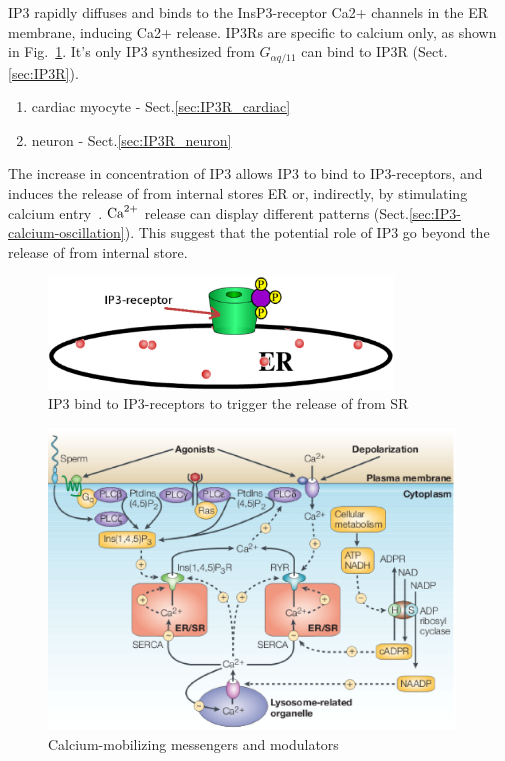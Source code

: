 IP3 rapidly diffuses and binds to the InsP3-receptor Ca2+ channels in the ER
membrane, inducing Ca2+ release. IP3Rs are specific to calcium only, as shown in
Fig.~\ref{fig:IP3-IP3R}.  It's only IP3 synthesized from $G_{\alpha
q/11}$ can bind to IP3R (Sect.\ref{sec:IP3R}).
\begin{enumerate}
  \item cardiac myocyte - Sect.\ref{sec:IP3R_cardiac}
  
  \item neuron - Sect.\ref{sec:IP3R_neuron}
\end{enumerate}

The increase in concentration of IP3 allows IP3 to bind to IP3-receptors, and
induces the release of  from internal stores ER or, indirectly, by
stimulating calcium entry~\citep{berridge1989ipa}. ${\text{Ca}^{2+}}$ release can display
different patterns (Sect.\ref{sec:IP3-calcium-oscillation}). This suggest that
the potential role of IP3 go beyond the release of  from internal
store\citep{kockskamper2008ip3}.


\begin{figure}[hbt]
 \centerline{\includegraphics[height=3cm]{./images/IP3_bind_IP3R.eps}}
\caption{IP3 bind to IP3-receptors to trigger the release of
   from SR}
\label{fig:IP3-IP3R}
\end{figure}


  \begin{figure}[htb]
    \centerline{\includegraphics[height=8cm]{./images/calcium_mobilizing.eps}}
    \caption{Calcium-mobilizing messengers and modulators}\label{fig:Ca_mobilizing}
  \end{figure}

